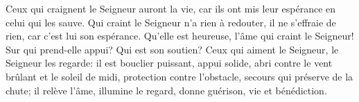 Ceux qui craignent le Seigneur auront la vie,
	car ils ont mis leur espérance en celui qui les sauve.
Qui craint le Seigneur n’a rien à redouter,
	il ne s’effraie de rien, car c’est lui son espérance.
Qu’elle est heureuse, l’âme qui craint le Seigneur!
	Sur qui prend-elle appui? Qui est son soutien?
Ceux qui aiment le Seigneur, le Seigneur les regarde:
	il est bouclier puissant, appui solide,
	abri contre le vent brûlant et le soleil de midi,
	protection contre l’obstacle, secours qui préserve de la chute;
	il relève l’âme, illumine le regard, donne guérison, vie et bénédiction.
